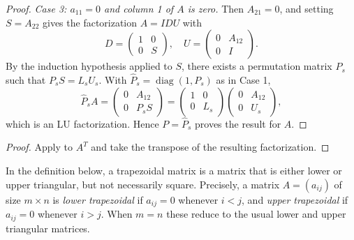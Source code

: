 \documentclass[final]{siamart1116}
\numberwithin{theorem}{section}
\DeclareMathOperator{\rk}{rank}
\newcommand{\by}{\times}
\begin{document}
\begin{proof}
  \emph{Case 3: $a_{11} = 0$ and column 1 of $A$ is zero.} Then $A_{21} = 0$, and setting $S = A_{22}$ gives the factorization $A = IDU$ with
  \[
    D =
    \begin{pmatrix}
      1 & 0 \\
      0 & S
    \end{pmatrix}, \quad
    U =
    \begin{pmatrix}
      0 & A_{12} \\
      0 & I
    \end{pmatrix}.
  \]
  By the induction hypothesis applied to $S$, there exists a permutation matrix $P_s$ such that $P_s S = L_s U_s$. With $\widehat{P}_s = \operatorname{diag}(1, P_s)$ as in Case 1,
  \[
    \widehat{P}_s A
    =
    \begin{pmatrix}
      0 & A_{12}  \\
      0 & P_s S
    \end{pmatrix}
    =
    \begin{pmatrix}
      1 & 0   \\
      0 & L_s
    \end{pmatrix}
    \begin{pmatrix}
      0 & A_{12} \\
      0 & U_s
    \end{pmatrix},
  \]
  which is an LU factorization. Hence $P = \widehat{P}_s$ proves the result for $A$.
\end{proof}


\begin{proof}
  Apply  to $A^T$ and take the transpose of the resulting factorization.
\end{proof}

In the definition below, a trapezoidal matrix is a matrix that is either lower or upper triangular, but not necessarily square. Precisely, a matrix $A = (a_{ij})$ of size $m \by n$ is \emph{lower trapezoidal} if $a_{ij} = 0$ whenever $i < j$, and \emph{upper trapezoidal} if $a_{ij} = 0$ whenever $i > j$. When $m = n$ these reduce to the usual lower and upper triangular matrices.

\end{document}
